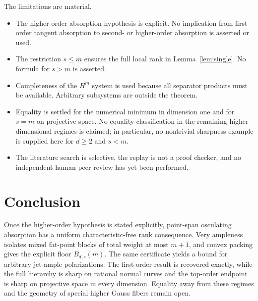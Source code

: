 \documentclass[11pt]{article}
\theoremstyle{definition}
\theoremstyle{remark}
\theoremstyle{plain}
\begin{document}
The limitations are material.
\begin{itemize}
\item The higher-order absorption hypothesis is explicit.  No implication
from first-order tangent absorption to second- or higher-order absorption is
asserted or used.
\item The restriction $s\leq m$ ensures the full local rank in
Lemma~\ref{lem:single}.  No formula for $s>m$ is asserted.
\item Completeness of the $H^m$ system is used because all separator products
must be available.  Arbitrary subsystems are outside the theorem.
\item Equality is settled for the numerical minimum in dimension one and for
$s=m$ on projective space.  No equality classification in the remaining
higher-dimensional regimes is claimed; in particular, no nontrivial sharpness
example is supplied here for $d\geq2$ and $s<m$.
\item The literature search is selective, the replay is not a proof checker,
and no independent human peer review has yet been performed.
\end{itemize}

\section{Conclusion}

Once the higher-order hypothesis is stated explicitly, point-span
osculating absorption has a uniform characteristic-free rank consequence.
Very ampleness isolates mixed fat-point blocks of total weight at most
$m+1$, and convex packing gives the explicit floor $B_{d,s}(m)$.  The same
certificate yields a bound for arbitrary jet-ample polarizations.  The
first-order result is recovered exactly, while the full hierarchy is sharp on
rational normal curves and the top-order endpoint is sharp on projective
space in every dimension.  Equality away from these regimes and the geometry
of special higher Gauss fibers remain open.
\end{document}
